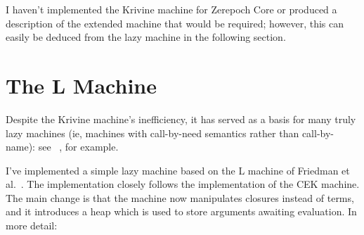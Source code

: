 \documentclass[a4paper]{article}
\begin{document}
I haven't implemented the Krivine machine for Zerepoch Core or produced
a description of the extended machine that would be required; however,
this can easily be deduced from the lazy machine in the following
section.


\section{The L Machine}
Despite the Krivine machine's inefficiency, it has served as a basis
for many truly lazy machines (ie, machines with call-by-need
semantics rather than call-by-name): see ~\cite{Sestoft, Friedman,
  Douence}, for example.

I've implemented a simple lazy machine based on the L machine of Friedman
et al.~\cite{Friedman}.  The implementation closely follows the
implementation of the CEK machine.  The main change is that the
machine now manipulates closures instead of terms, and it introduces a
heap which is used to store arguments awaiting evaluation.  In more
detail:
\end{document}
